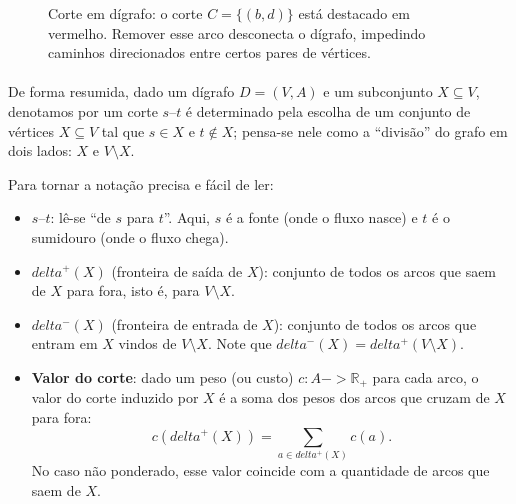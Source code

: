 \documentclass[12pt,a4paper]{article}
\def\\{}%
\def\emph#1{#1}%
\def\to{->}%
\def\delta{delta}%
\begin{document}
\begin{figure}[H]
\centering
{}
\caption{Corte em dígrafo: o corte $C=\{(b,d)\}$ está destacado em vermelho. Remover esse arco desconecta o dígrafo, impedindo caminhos direcionados entre certos pares de vértices.}
\label{fig:corte}
\end{figure}

\paragraph{}
De forma resumida, dado um dígrafo \(D=(V,A)\) e um subconjunto \(X\subseteq V\), denotamos por um corte \(s\text{--}t\) é determinado pela escolha de um conjunto de vértices \(X\subseteq V\) tal que \(s\in X\) e \(t\notin X\); pensa-se nele como a “divisão” do grafo em dois lados: \(X\) e \(V\setminus X\).

Para tornar a notação precisa e fácil de ler:
\begin{itemize}
    \item \textbf{\(s\text{--}t\)}: lê-se “de \(s\) para \(t\)”. Aqui, \(s\) é a fonte (onde o fluxo nasce) e \(t\) é o sumidouro (onde o fluxo chega).
    \item \textbf{\(\delta^+(X)\)} (fronteira de saída de \(X\)): conjunto de todos os arcos que \emph{saem} de \(X\) para fora, isto é, para \(V\setminus X\).
    \item \textbf{\(\delta^-(X)\)} (fronteira de entrada de \(X\)): conjunto de todos os arcos que \emph{entram} em \(X\) vindos de \(V\setminus X\). Note que \(\delta^-(X)=\delta^+(V\setminus X)\).
    \item \textbf{Valor do corte}: dado um peso (ou custo) \(c:A\to\mathbb{R}_+\) para cada arco, o valor do corte induzido por \(X\) é a soma dos pesos dos arcos que cruzam de \(X\) para fora: 
    \[c(\delta^+(X))=\sum_{a\in\delta^+(X)} c(a).\]
    No caso não ponderado, esse valor coincide com a \emph{quantidade} de arcos que saem de \(X\).
\end{itemize}
\end{document}
